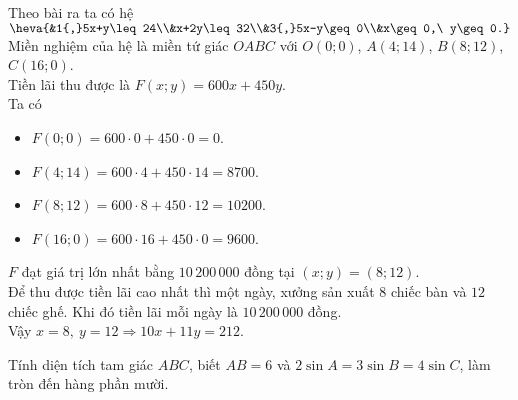 \begin{ex}
{	Theo bài ra ta có hệ
	$\heva{&1{,}5x+y\leq 24\\&x+2y\leq 32\\&3{,}5x-y\geq 0\\&x\geq 0,\ y\geq 0.}$\\
	Miền nghiệm của hệ là miền tứ giác $OABC$ với $O(0;0)$, $A(4;14)$, $B(8;12)$, $C(16;0)$.\\
	Tiền lãi thu được là $F(x;y)=600x+450y$.\\
	Ta có
	\begin{itemize}
		\item $F(0;0)=600\cdot 0+450\cdot 0=0$.
		\item $F(4;14)=600\cdot 4+450\cdot 14=8700$.
		\item $F(8;12)=600\cdot 8+450\cdot 12=10200$.
		\item $F(16;0)=600\cdot 16+450\cdot 0=9600$.
	\end{itemize}
	$F$ đạt giá trị lớn nhất bằng $10\,200\,000$ đồng tại $(x;y)=(8;12)$.\\
	Để thu được tiền lãi cao nhất thì một ngày, xưởng sản xuất $8$ chiếc bàn và $12$ chiếc ghế. Khi đó tiền lãi mỗi ngày là $10\,200\,000$ đồng.\\
	Vậy $x=8,\ y=12 \Rightarrow 10x+11y=212$.}
\end{ex}

\begin{ex}%
	Tính diện tích tam giác $ABC$, biết $AB=6$ và $2\sin A=3\sin B=4\sin C$, làm tròn đến hàng phần mười.
\end{ex}

